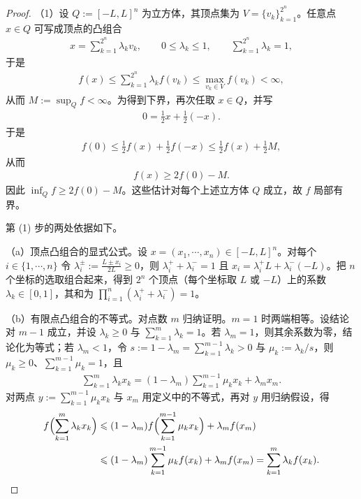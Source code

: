 \documentclass[../../main.tex]{subfiles}%
\begin{document}
\begin{proof}
（1）设 $Q:=[-L,L]^{n}$ 为立方体，其顶点集为 $V=\{v_k\}_{k=1}^{2^{n}}$。任意点 $x\in Q$ 可写成顶点的凸组合
\begin{align*}
x=\sum_{k=1}^{2^{n}}\lambda_kv_k,\qquad 0\leqslant\lambda_k\leqslant1,\qquad\sum_{k=1}^{2^{n}}\lambda_k=1,
\end{align*}
于是
\begin{align*}
f(x)\leqslant\sum_{k=1}^{2^{n}}\lambda_kf(v_k)\leqslant\max_{v_k\in V}f(v_k)<\infty,
\end{align*}
从而 $M:=\sup_{Q}f<\infty$。为得到下界，再次任取 $x\in Q$，并写
\begin{align*}
0=\frac12x+\frac12(-x).
\end{align*}
于是
\begin{align*}
f(0)\leqslant\frac12f(x)+\frac12f(-x)\leqslant\frac12f(x)+\frac12M,
\end{align*}
从而
\begin{align*}
f(x)\geqslant2f(0)-M.
\end{align*}
因此 $\inf_{Q}f\geqslant2f(0)-M$。这些估计对每个上述立方体 $Q$ 成立，故 $f$ 局部有界。

第 (1) 步的两处依据如下。

（a）顶点凸组合的显式公式。设 $x=(x_1,\cdots,x_n)\in[-L,L]^{n}$。对每个 $i\in\{1,\cdots,n\}$ 令 $\lambda_i^{\pm}:=\frac{L\pm x_i}{2L}\geqslant0$，则 $\lambda_i^{+}+\lambda_i^{-}=1$ 且 $x_i=\lambda_i^{+}L+\lambda_i^{-}(-L)$。把 $n$ 个坐标的选取组合起来，得到 $2^{n}$ 个顶点（每个坐标取 $L$ 或 $-L$）上的系数 $\lambda_k\in[0,1]$，其和为 $\prod_{i=1}^{n}(\lambda_i^{+}+\lambda_i^{-})=1$。

（b）有限点凸组合的不等式。对点数 $m$ 归纳证明。$m=1$ 时两端相等。设结论对 $m-1$ 成立，并设 $\lambda_k\geqslant0$ 与 $\sum_{k=1}^{m}\lambda_k=1$。若 $\lambda_m=1$，则其余系数为零，结论化为等式；若 $\lambda_m<1$，令 $s:=1-\lambda_m=\sum_{k=1}^{m-1}\lambda_k>0$ 与 $\mu_k:=\lambda_k/s$，则 $\mu_k\geqslant0$、$\sum_{k=1}^{m-1}\mu_k=1$，且
\begin{align*}
\sum_{k=1}^{m}\lambda_kx_k=(1-\lambda_m)\sum_{k=1}^{m-1}\mu_kx_k+\lambda_mx_m .
\end{align*}
对两点 $y:=\sum_{k=1}^{m-1}\mu_kx_k$ 与 $x_m$ 用定义中的不等式，再对 $y$ 用归纳假设，得
\begin{align*}
f\Bigl(\sum_{k=1}^{m}\lambda_kx_k\Bigr)
&\leqslant(1-\lambda_m)f\Bigl(\sum_{k=1}^{m-1}\mu_kx_k\Bigr)+\lambda_mf(x_m)\\
&\leqslant(1-\lambda_m)\sum_{k=1}^{m-1}\mu_kf(x_k)+\lambda_mf(x_m)=\sum_{k=1}^{m}\lambda_kf(x_k).
\end{align*}


\end{proof}
\end{document}
